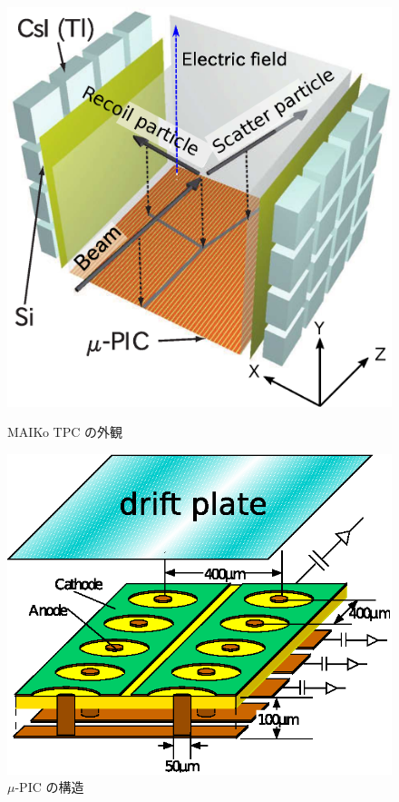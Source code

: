 \documentclass{jps-cp}
\begin{document}
\begin{figure}
  \centering
  \begin{minipage}{0.4\columnwidth}
    \centering
    \includegraphics[clip, width=0.9\columnwidth]{eps/MAIKo.eps}
    \caption{MAIKo TPC の外観}
    \label{fig:MAIKo}
  \end{minipage}
  \hfill
  \begin{minipage}{0.4\columnwidth}
    \centering
    \includegraphics[clip, width=0.9\columnwidth]{eps/upic_struc.eps}
    \caption{$\mu$-PIC の構造}
    \label{fig:uPIC}
  \end{minipage}
\end{figure}
\end{document}
